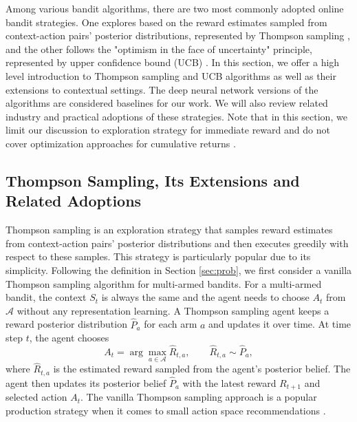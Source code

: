 Among various bandit algorithms, there are two most commonly adopted online bandit strategies. One explores based on the reward estimates sampled from context-action pairs' posterior distributions, represented by Thompson sampling \cite{thompson1933likelihood}, and the other follows the "optimism in the face of uncertainty" principle, represented by upper confidence bound (UCB) \cite{agrawal1995sample, auer2002finite}. In this section, we offer a high level introduction to Thompson sampling and UCB algorithms as well as their extensions to contextual settings. The deep neural network versions of the algorithms are considered baselines for our work. We will also review related industry and practical adoptions of these strategies. Note that in this section, we limit our discussion to exploration strategy for immediate reward and do not cover optimization approaches for cumulative returns \cite{zhu2023deep, xu2023optimize, chen2021exploration}.

\subsection{Thompson Sampling, Its Extensions and Related Adoptions} \label{sec:ts}
Thompson sampling is an exploration strategy that samples reward estimates from context-action pairs' posterior distributions and then executes greedily with respect to these samples. This strategy is particularly popular due to its simplicity. Following the definition in Section \ref{sec:prob}, we first consider a vanilla Thompson sampling algorithm \cite{thompson1933likelihood} for multi-armed bandits. For a multi-armed bandit, the context $S_t$ is always the same and the agent needs to choose $A_t$ from $\mathcal{A}$ without any representation learning. A Thompson sampling agent keeps a reward posterior distribution $\hat{P}_{a}$ for each arm $a$ and updates it over time. At time step $t$, the agent chooses
\begin{equation}
    A_t = \arg\max_{a \in \mathcal{A}} \hat{R}_{t, a}, \qquad \hat{R}_{t, a} \sim \hat{P}_a,
\end{equation}
where $\hat{R}_{t, a}$ is the estimated reward sampled from the agent's posterior belief. The agent then updates its posterior belief $\hat{P}_{a}$ with the latest reward $R_{t+1}$ and selected action $A_t$. The vanilla Thompson sampling approach is a popular production strategy when it comes to small action space recommendations \cite{sanz2019simple, hsieh2015efficient}. 

